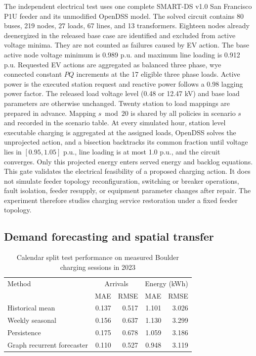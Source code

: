 \documentclass[journal]{IEEEtran}
\providecommand{\DIFadd}[1]{{\protect\color{blue}\uwave{#1}}} %
\newcommand{\DIFnewtablecolor}{\color{blue}}
\renewcommand{\DIFadd}[1]{{\color{blue}#1}}
\begin{document}
\DIFadd{The independent electrical test uses one complete SMART-DS v1.0 San Francisco
P1U feeder and its unmodified OpenDSS model.  The solved circuit contains 80
buses, 219 nodes, 27 loads,
67 lines, and 13 transformers.  Eighteen nodes already deenergized in the
released base case are identified and excluded from active voltage minima.
They are not counted as failures caused by EV action.  The base active node voltage
minimum is 0.989 p.u. and maximum line loading is 0.912 p.u.  Requested EV
actions are aggregated as balanced three phase, wye connected constant $PQ$
increments at the 17 eligible three phase loads.  Active power is the executed
station request and reactive power follows a 0.98 lagging power factor.  The
released load voltage level (0.48 or 12.47 kV) and base load parameters are
otherwise unchanged.  Twenty
station to load mappings are prepared in advance.  Mapping $s\bmod20$ is
shared by all policies in scenario $s$ and recorded in the scenario table.
At every simulated hour, station level executable charging is aggregated at the
assigned loads, OpenDSS solves the unprojected action, and a bisection backtracks
its common fraction until voltage lies in $[0.95,1.05]$ p.u., line loading is at
most 1.0 p.u., and the circuit converges.  Only this projected energy enters
served energy and backlog equations.  This gate validates the electrical
feasibility of a proposed charging action.  It does not simulate feeder
topology reconfiguration, switching or breaker operations, fault isolation,
feeder resupply, or equipment parameter changes after repair.  The experiment
therefore studies charging service restoration under a fixed feeder topology.
}

\subsection{\DIFadd{Demand forecasting and spatial transfer}}
\label{sec:forecast-results}

\begin{table}[t]\DIFnewtablecolor
\centering
\caption{Calendar split test performance on measured Boulder charging sessions in 2023}
\label{tab:real-ev-forecast}
\begin{tabular}{lrrrr}
\toprule
Method & \multicolumn{2}{c}{Arrivals} & \multicolumn{2}{c}{Energy (kWh)} \\
 & MAE & RMSE & MAE & RMSE \\
\midrule
Historical mean & 0.137 & 0.517 & 1.101 & 3.026 \\
Weekly seasonal & 0.156 & 0.637 & 1.130 & 3.299 \\
Persistence & 0.175 & 0.678 & 1.059 & 3.186 \\
Graph recurrent forecaster & 0.110 & 0.527 & 0.948 & 3.119 \\
\bottomrule
\end{tabular}
\end{table}
\end{document}
